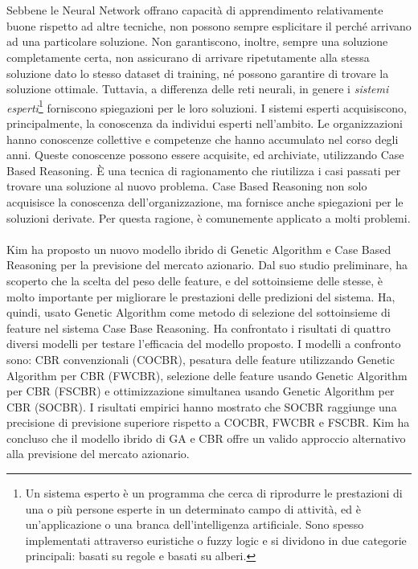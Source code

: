 \documentclass[a4paper,12pt]{report}
\begin{document}
\\~\\Sebbene le Neural Network offrano capacità di apprendimento relativamente buone rispetto ad altre tecniche, non possono sempre esplicitare il perché arrivano ad una particolare soluzione. Non garantiscono, inoltre, sempre una soluzione completamente certa, non assicurano di arrivare ripetutamente alla stessa soluzione dato lo stesso dataset di training, né possono garantire di trovare la soluzione ottimale\cite{40}. Tuttavia, a differenza delle reti neurali, in genere i \textit{sistemi esperti}\footnote{Un sistema esperto è un programma che cerca di riprodurre le prestazioni di una o più persone esperte in un determinato campo di attività, ed è un'applicazione o una branca dell'intelligenza artificiale. Sono spesso implementati attraverso euristiche o fuzzy logic e si dividono in due categorie principali: basati su regole e basati su alberi.} forniscono spiegazioni per le loro soluzioni. I sistemi esperti acquisiscono, principalmente, la conoscenza da individui esperti nell'ambito. Le organizzazioni hanno conoscenze collettive e competenze che hanno accumulato nel corso degli anni. Queste conoscenze possono essere acquisite, ed archiviate, utilizzando Case Based Reasoning. È una tecnica di ragionamento che riutilizza i casi passati per trovare una soluzione al nuovo problema. Case Based Reasoning non solo acquisisce la conoscenza dell'organizzazione, ma fornisce anche spiegazioni per le soluzioni derivate. Per questa ragione, è comunemente applicato a molti problemi.\\~\\ Kim \cite{17} ha proposto un nuovo modello ibrido di Genetic Algorithm e Case Based Reasoning per la previsione del mercato azionario. Dal suo studio preliminare, ha scoperto che la scelta del peso delle feature, e del sottoinsieme delle stesse, è molto importante per migliorare le prestazioni delle predizioni del sistema. Ha, quindi, usato Genetic Algorithm come metodo di selezione del sottoinsieme di feature nel sistema Case Base Reasoning. Ha confrontato i risultati di quattro diversi modelli per testare l'efficacia del modello proposto. I modelli a confronto sono: CBR convenzionali (COCBR), pesatura delle feature utilizzando Genetic Algorithm per CBR (FWCBR), selezione delle feature usando Genetic Algorithm per CBR (FSCBR) e ottimizzazione simultanea usando Genetic Algorithm per CBR (SOCBR). I risultati empirici hanno mostrato che SOCBR raggiunge una precisione di previsione superiore rispetto a COCBR, FWCBR e FSCBR. Kim ha concluso che il modello ibrido di GA e CBR offre un valido approccio alternativo alla previsione del mercato azionario.
\end{document}
